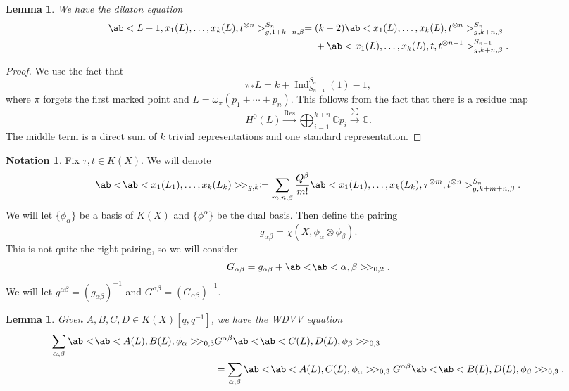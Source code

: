 \documentclass{amsart}
\newtheorem{lem}[thm]{Lemma}
\theoremstyle{definition}
\newtheorem{notn}[thm]{Notation}
\theoremstyle{remark}
\theoremstyle{plain}
\theoremstyle{definition}
\theoremstyle{remark}
\newcommand{\C}{\mathbb{C}}
\newcommand{\on}[1]{\operatorname{#1}}
\newcommand{\1}{\mathbf{1}}
\newcommand{\2}{\mathbf{2}}
\newcommand{\3}{\mathbf{3}}
\begin{document}
\begin{lem}
    We have the \textit{dilaton equation}
    \begin{align*}
        \ab<L-1, x_1(L), \ldots, x_k(L), t^{\otimes n}>_{g,1+k+n,\beta}^{S_n} ={}& (k-2)\ab<x_1(L), \ldots, x_k(L), t^{\otimes n}>_{g,k+n,\beta}^{S_n} \\
        &+ \ab<x_1(L), \ldots, x_k(L), t, t^{\otimes n-1}>_{g,k+n,\beta}^{S_{n-1}}.
    \end{align*}
\end{lem}

\begin{proof}
    We use the fact that
    \[ \pi_* L = k + \on{Ind}_{S_{n-1}}^{S_n}(1) - 1, \]
    where \(\pi\) forgets the first marked point and \(L = \omega_{\pi} (p_1 + \cdots + p_n)\). This follows from the fact that there is a residue map
    \[ H^0(L) \xrightarrow{\on{Res}} \bigoplus_{i=1}^{k+n} \C p_i \xrightarrow{\sum} \C. \]
    The middle term is a direct sum of \(k\) trivial representations and one standard representation.
\end{proof}

\begin{notn}
    Fix \(\tau, t \in K(X)\). We will denote
    \[ \ab<\!\ab<x_1(L_1), \ldots, x_k(L_k)>\!>_{g,k} \coloneqq \sum_{m,n,\beta} \frac{Q^{\beta}}{m!} \ab<x_1(L_1), \ldots, x_k(L_k), \tau^{\otimes m}, t^{\otimes n}>_{g,k+m+n,\beta}^{S_n}. \]
    We will let \(\{\phi_{\alpha}\}\) be a basis of \(K(X)\) and \(\{\phi^{\alpha}\}\) be the dual basis. Then define the pairing
    \[ g_{\alpha\beta} = \chi(X, \phi_{\alpha} \otimes \phi_{\beta}). \]
    This is not quite the right pairing, so we will consider
    \[ G_{\alpha\beta} = g_{\alpha\beta} + \ab<\!\ab<\alpha,\beta>\!>_{0,2}. \]
    We will let \(g^{\alpha\beta} = (g_{\alpha\beta})^{-1}\) and \(G^{\alpha\beta} = (G_{\alpha\beta})^{-1}\).
\end{notn}

\begin{lem}
    Given \(A,B,C,D \in K(X)[q,q^{-1}]\), we have the \textit{WDVV equation}
    \begin{align*}
        \sum_{\alpha,\beta} \ab<\!\ab< A(L), B(L), \phi_{\alpha}>\! >_{0,3}& G^{\alpha\beta}\ab<\!\ab< C(L), D(L), \phi_{\beta}>\! >_{0,3} \\
        &= \sum_{\alpha,\beta} \ab<\!\ab< A(L), C(L), \phi_{\alpha}>\! >_{0,3} G^{\alpha\beta}\ab<\!\ab< B(L), D(L), \phi_{\beta}>\! >_{0,3}. 
    \end{align*}
\end{lem}
\end{document}
